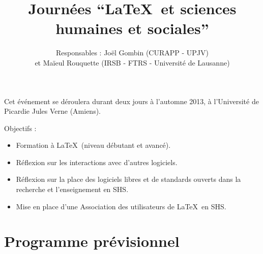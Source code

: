 \documentclass[11pt]{article}
\begin{document}
\title{Journées \enquote{\LaTeX\ et sciences humaines et sociales}}
\author{Responsables : Joël Gombin (CURAPP - UPJV) \\ et Maïeul Rouquette (IRSB - FTRS - Université de Lausanne)}
\maketitle


Cet événement se déroulera durant deux jours à l'automne 2013, à l'Université de Picardie Jules Verne (Amiens). 

\vspace{12pt}


Objectifs :
\begin{itemize}
\item Formation à \LaTeX\ (niveau débutant et avancé).
\item Réflexion sur les interactions avec d'autres logiciels.
\item Réflexion sur la place des logiciels libres et de standards ouverts dans la recherche et l'enseignement en SHS.
\item Mise en place d'une Association des utilisateurs de \LaTeX\ en SHS.
\end{itemize}

\section{Programme prévisionnel}
\end{document}
